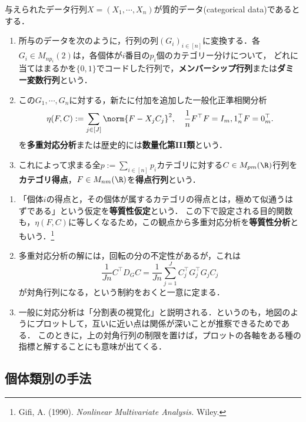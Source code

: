 \documentclass[uplatex,dvipdfmx]{jsreport}
\begin{document}
\begin{definition}
    与えられたデータ行列$X=(X_1,\cdots,X_n)$が質的データ(categorical data)であるとする．
    \begin{enumerate}
        \item 所与のデータを次のように，行列の列$(G_i)_{i\in[n]}$に変換する．各$G_i\in M_{np_i}(2)$は，各個体が$i$番目の$p_i$個のカテゴリー分けについて，
        どれに当てはまるかを$\{0,1\}$でコードした行列で，\textbf{メンバーシップ行列}または\textbf{ダミー変数行列}という．
        \item この$G_1,\cdots,G_n$に対する，新たに付加を追加した一般化正準相関分析
        \[\eta(F,C):=\sum_{j\in[J]}\norm{F-X_jC_j}^2,\quad \frac{1}{n}F^\top F=I_m,1_n^\top F=0_m^\top.\]
        を\textbf{多重対応分析}または歴史的には\textbf{数量化第III類}という．
        \item これによって求まる全$p:=\sum_{i\in[n]}p_i$カテゴリに対する$C\in M_{pm}(\R)$行列を\textbf{カテゴリ得点}，$F\in M_{nm}(\R)$を\textbf{得点行列}という．
    \end{enumerate}
\end{definition}
\begin{remarks}\mbox{}
    \begin{enumerate}
        \item 「個体$i$の得点と，その個体が属するカテゴリの得点とは，極めて似通うはずである」という仮定を\textbf{等質性仮定}という．
        この下で設定される目的関数も，$\eta(F,C)$に等しくなるため，この観点から多重対応分析を\textbf{等質性分析}ともいう．\footnote{Gifi, A. (1990). \textit{Nonlinear Multivariate Analysis.} Wiley.}
        \item 多重対応分析の解には，回転の分の不定性があるが，これは
        \[\frac{1}{Jn}C^\top D_GC=\frac{1}{Jn}\sum_{j=1}^JC_j^\top G_j^\top G_jC_j\]
        が対角行列になる，という制約をおくと一意に定まる．
        \item 一般に対応分析は「分割表の視覚化」と説明される．というのも，地図のようにプロットして，互いに近い点は関係が深いことが推察できるためである．
        このときに，上の対角行列の制限を置けば，プロットの各軸をある種の指標と解することにも意味が出てくる．
    \end{enumerate}
\end{remarks}

\subsection{個体類別の手法}
\end{document}

